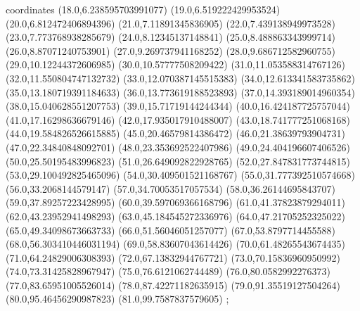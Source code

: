 coordinates {%
(18.0,6.238595703991077)
(19.0,6.519222429953524)
(20.0,6.812472406894396)
(21.0,7.11891345836905)
(22.0,7.439138949973528)
(23.0,7.773768938285679)
(24.0,8.12345137148841)
(25.0,8.488863343999714)
(26.0,8.87071240753901)
(27.0,9.269737941168252)
(28.0,9.686712582960755)
(29.0,10.12244372606985)
(30.0,10.57777508209422)
(31.0,11.053588314767126)
(32.0,11.550804747132732)
(33.0,12.070387145515383)
(34.0,12.613341583735862)
(35.0,13.180719391184633)
(36.0,13.773619188523893)
(37.0,14.393189014960354)
(38.0,15.040628551207753)
(39.0,15.71719144244344)
(40.0,16.424187725757044)
(41.0,17.16298636679146)
(42.0,17.935017910488007)
(43.0,18.741777251068168)
(44.0,19.584826526615885)
(45.0,20.46579814386472)
(46.0,21.38639793904731)
(47.0,22.34840848092701)
(48.0,23.353692522407986)
(49.0,24.404196607406526)
(50.0,25.50195483996823)
(51.0,26.649092822928765)
(52.0,27.847831773744815)
(53.0,29.100492825465096)
(54.0,30.409501521168767)
(55.0,31.777392510574668)
(56.0,33.2068144579147)
(57.0,34.70053517057534)
(58.0,36.26144695843707)
(59.0,37.89257223428995)
(60.0,39.597069366168796)
(61.0,41.37823879294011)
(62.0,43.23952941498293)
(63.0,45.184545272336976)
(64.0,47.21705252325022)
(65.0,49.34098673663733)
(66.0,51.56046051257077)
(67.0,53.8797714455588)
(68.0,56.303410446031194)
(69.0,58.83607043614426)
(70.0,61.48265543674435)
(71.0,64.24829006308393)
(72.0,67.13832944767721)
(73.0,70.15836960950992)
(74.0,73.31425828967947)
(75.0,76.6121062744489)
(76.0,80.0582992276373)
(77.0,83.65951005526014)
(78.0,87.42271182635915)
(79.0,91.35519127504264)
(80.0,95.46456290987823)
(81.0,99.7587837579605)
};
